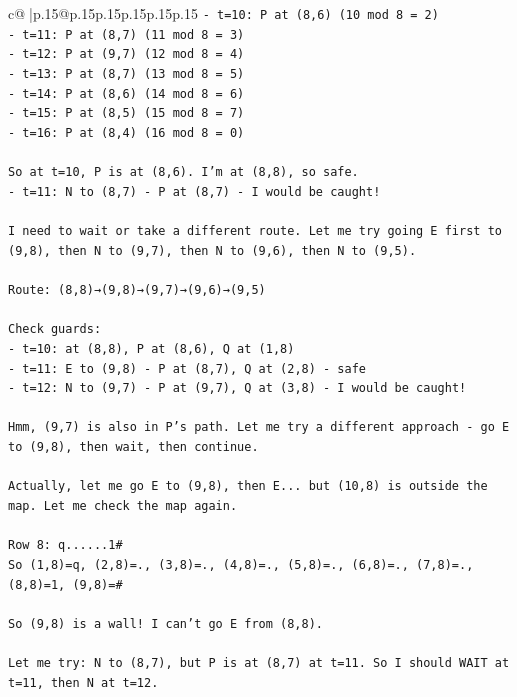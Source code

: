 \documentclass{article}
\begin{document}
{\begin{supertabular}{c@{$\;$}|p{.15\linewidth}@{}p{.15\linewidth}p{.15\linewidth}p{.15\linewidth}p{.15\linewidth}p{.15\linewidth}}
{{{\texttt{{-} t=10: P at (8,6) (10 mod 8 = 2)} \\
\texttt{{-} t=11: P at (8,7) (11 mod 8 = 3)} \\
\texttt{{-} t=12: P at (9,7) (12 mod 8 = 4)} \\
\texttt{{-} t=13: P at (8,7) (13 mod 8 = 5)} \\
\texttt{{-} t=14: P at (8,6) (14 mod 8 = 6)} \\
\texttt{{-} t=15: P at (8,5) (15 mod 8 = 7)} \\
\texttt{{-} t=16: P at (8,4) (16 mod 8 = 0)} \\
\\ 
\texttt{So at t=10, P is at (8,6). I'm at (8,8), so safe.} \\
\texttt{{-} t=11: N to (8,7) {-} P at (8,7) {-} I would be caught!} \\
\\ 
\texttt{I need to wait or take a different route. Let me try going E first to (9,8), then N to (9,7), then N to (9,6), then N to (9,5).} \\
\\ 
\texttt{Route: (8,8)→(9,8)→(9,7)→(9,6)→(9,5)} \\
\\ 
\texttt{Check guards:} \\
\texttt{{-} t=10: at (8,8), P at (8,6), Q at (1,8)} \\
\texttt{{-} t=11: E to (9,8) {-} P at (8,7), Q at (2,8) {-} safe} \\
\texttt{{-} t=12: N to (9,7) {-} P at (9,7), Q at (3,8) {-} I would be caught!} \\
\\ 
\texttt{Hmm, (9,7) is also in P's path. Let me try a different approach {-} go E to (9,8), then wait, then continue.} \\
\\ 
\texttt{Actually, let me go E to (9,8), then E... but (10,8) is outside the map. Let me check the map again.} \\
\\ 
\texttt{Row 8: q......1\#} \\
\texttt{So (1,8)=q, (2,8)=., (3,8)=., (4,8)=., (5,8)=., (6,8)=., (7,8)=., (8,8)=1, (9,8)=\#} \\
\\ 
\texttt{So (9,8) is a wall! I can't go E from (8,8).} \\
\\ 
\texttt{Let me try: N to (8,7), but P is at (8,7) at t=11. So I should WAIT at t=11, then N at t=12.} \\
}}}
\end{supertabular}}
\end{document}
